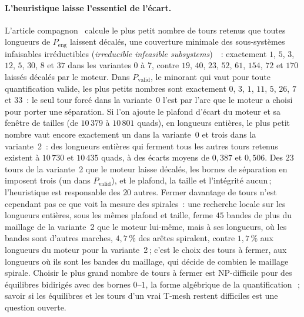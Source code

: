 \documentclass[11pt,a4paper]{article}
\begin{document}
\paragraph{L'heuristique laisse l'essentiel de l'écart.}
L'article compagnon~\cite{gardent2026turns} calcule le plus petit nombre de
tours retenus que toutes longueurs de $P_{\mathrm{eng}}$ laissent décalés,
une couverture minimale des sous-systèmes infaisables irréductibles
(\emph{irreducible infeasible subsystems})~\cite{parker1996iis}~:
exactement $1$, $5$, $3$, $12$, $5$, $30$, $8$ et $37$ dans les variantes 0
à 7, contre $19$, $40$, $23$, $52$, $61$, $154$, $72$ et $170$ laissés
décalés par le moteur. Dans $P_{\mathrm{valid}}$, le minorant qui vaut pour
toute quantification valide, les plus petits nombres sont exactement $0$,
$3$, $1$, $11$, $5$, $26$, $7$ et 33~: le seul tour forcé dans la variante~0
l'est par l'arc que le moteur a choisi pour porter une séparation. Si l'on ajoute le plafond d'écart du moteur et sa
fenêtre de tailles (de $10\,379$ à $10\,801$ quads), en longueurs entières,
le plus petit nombre vaut encore exactement un dans la variante~0 et trois
dans la variante~2~: des longueurs entières qui ferment tous les autres
tours retenus existent à $10\,730$ et $10\,435$ quads, à des écarts moyens
de $0,387$ et $0,506$. Des $23$ tours de la variante~2 que le moteur laisse
décalés, les bornes de séparation en imposent trois (un dans
$P_{\mathrm{valid}}$), et le plafond, la taille et l'intégrité aucun\,; l'heuristique est responsable des $20$
autres. Fermer davantage de tours n'est cependant pas ce que voit la mesure
des spirales~: une recherche locale sur les longueurs entières, sous les
mêmes plafond et taille, ferme $45$ bandes de plus du maillage de la
variante~2 que le moteur lui-même, mais à ses longueurs, où les bandes sont
d'autres marches, $4,7\,\%$ des arêtes spiralent, contre $1,7\,\%$ aux
longueurs du moteur pour la variante~2\,; c'est le choix des tours à
fermer, aux longueurs où ils sont les bandes du maillage, qui décide de
combien le maillage spirale. Choisir le plus grand nombre de tours
à fermer est NP-difficile pour des équilibres bidirigés avec des bornes
$0$--$1$, la forme algébrique de la quantification~\cite{gardent2026turns}\,;
savoir si les équilibres et les tours d'un vrai T-mesh restent difficiles est
une question ouverte.
\end{document}
